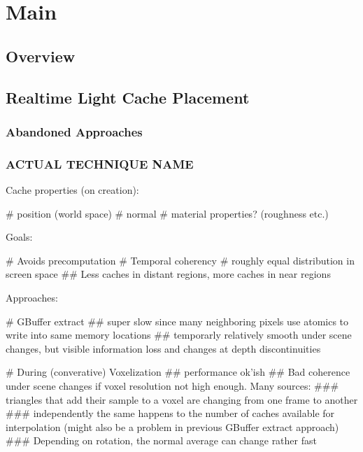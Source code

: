 \documentclass[thesis.tex]{subfiles}
\begin{document}
\chapter{Main}\label{chap:basics}

\section{Overview}

\section{Realtime Light Cache Placement}

\subsection{Abandoned Approaches}

\subsection{ACTUAL TECHNIQUE NAME}

Cache properties (on creation):
\begin{easylist}[itemize]
# position (world space)
# normal
# material properties? (roughness etc.)
\end{easylist}

Goals:
\begin{easylist}[itemize]
# Avoids precomputation
# Temporal coherency
# roughly equal distribution in screen space
## Less caches in distant regions, more caches in near regions
\end{easylist}
Approaches:
\begin{easylist}[itemize]
# GBuffer extract
## super slow since many neighboring pixels use atomics to write into same memory locations
## temporarly relatively smooth under scene changes, but visible information loss and changes at depth discontinuities

# During (converative) Voxelization
## performance ok'ish
## Bad coherence under scene changes if voxel resolution not high enough. Many sources:
### triangles that add their sample to a voxel are changing from one frame to another
### independently the same happens to the number of caches available for interpolation (might also be a problem in previous GBuffer extract approach)
### Depending on rotation, the normal average can change rather fast
\end{easylist}
\end{document}
